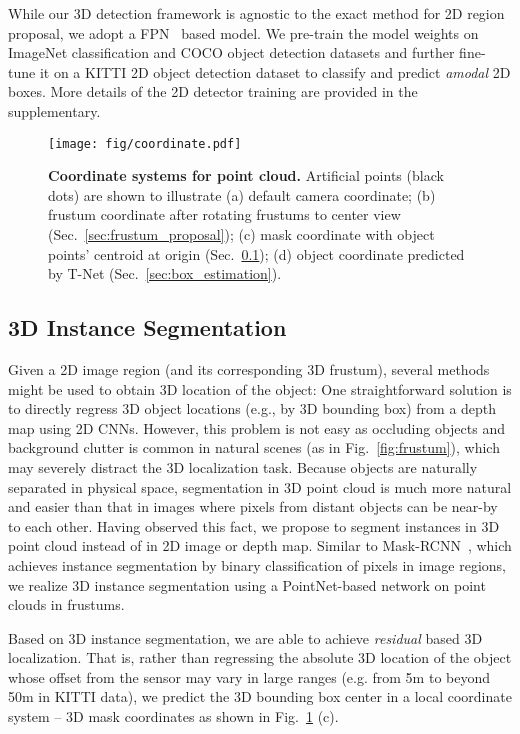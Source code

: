 \documentclass[10pt,twocolumn,letterpaper]{article}
\begin{document}
While our 3D detection framework is agnostic to the exact method for 2D region proposal, we adopt a FPN~\cite{lin2016feature} based model. We pre-train the model weights on ImageNet classification and COCO object detection datasets and further fine-tune it on a KITTI 2D object detection dataset to classify and predict \emph{amodal} 2D boxes. More details of the 2D detector training are provided in the supplementary.


\begin{figure}[t!]
    \centering
    \texttt{[image: fig/coordinate.pdf]}
    \caption{\textbf{Coordinate systems for point cloud.} Artificial points (black dots) are shown to illustrate (a) default camera coordinate; (b) frustum coordinate after rotating frustums to center view (Sec.~\ref{sec:frustum_proposal}); (c) mask coordinate with object points' centroid at origin (Sec.~\ref{sec:instance_seg}); (d) object coordinate predicted by T-Net (Sec.~\ref{sec:box_estimation}).
    }
    \label{fig:coordinate}
\end{figure}

\subsection{3D Instance Segmentation}
\label{sec:instance_seg}


Given a 2D image region (and its corresponding 3D frustum), several methods might be used to obtain 3D location of the object:
One straightforward solution is to directly regress 3D object locations (e.g., by 3D bounding box) from a depth map using 2D CNNs. However, this problem is not easy as occluding objects and background clutter is common in natural scenes (as in Fig.~\ref{fig:frustum}), which may severely distract the 3D localization task. Because objects are naturally separated in physical space, segmentation in 3D point cloud is much more natural and easier than that in images where pixels from distant objects can be near-by to each other. Having observed this fact, we propose to segment instances in 3D point cloud instead of in 2D image or depth map. Similar to Mask-RCNN~\cite{he2017mask}, which achieves instance segmentation by binary classification of pixels in image regions, we realize 3D instance segmentation using a PointNet-based network on point clouds in frustums.

Based on 3D instance segmentation, we are able to achieve \emph{residual} based 3D localization. That is, rather than regressing the absolute 3D location of the object whose offset from the sensor may vary in large ranges (e.g. from 5m to beyond 50m in KITTI data), we predict the 3D bounding box center in a local coordinate system -- 3D mask coordinates as shown in Fig.~\ref{fig:coordinate} (c).
\end{document}

